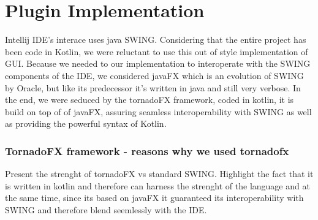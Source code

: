 	\section{Plugin Implementation}
	Intellij IDE's interace uses java SWING. Considering that the entire project has been code in Kotlin, we were reluctant to use this out of style implementation of GUI. Because we needed to our implementation to interoperate with the SWING components of the IDE, we considered javaFX\cite{oracle_javafx} which is an evolution of SWING by Oracle, but like its predecessor it's written in java and still very verbose. In the end, we were seduced by the tornadoFX\cite{tornadoFX} framework, coded in kotlin, it is build on top of of javaFX, assuring seamless interoperability with SWING as well as providing the powerful syntax of Kotlin.

		\subsubsection{TornadoFX framework - reasons why we used tornadofx}
		Present the strenght of tornadoFX vs standard SWING. Highlight the fact that it is written in kotlin and therefore can harness the strenght of the language and at the same time, since its based on javaFX it guaranteed its interoperability with SWING and therefore blend seemlessly with the IDE.

